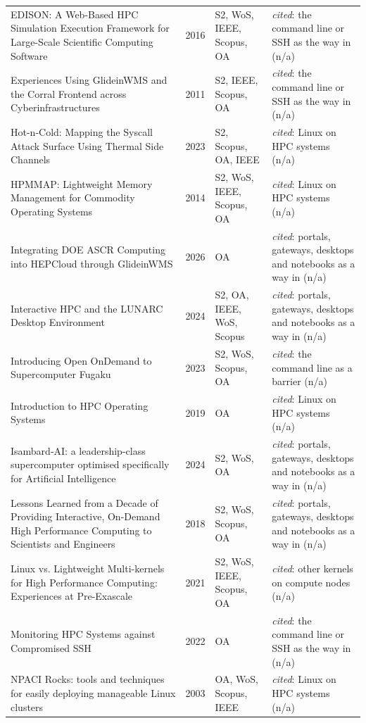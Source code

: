 \begin{longtable}{@{}%
  >{\raggedright\arraybackslash}p{}c%
  >{\raggedright\arraybackslash}p{}%
  >{\raggedright\arraybackslash}p{}@{}}
EDISON: A Web-Based HPC Simulation Execution Framework for Large-Scale Scientific Computing Software & 2016 & S2, WoS, IEEE, Scopus, OA & \emph{cited}: the command line or SSH as the way in (n/a) \\
Experiences Using GlideinWMS and the Corral Frontend across Cyberinfrastructures & 2011 & S2, IEEE, Scopus, OA & \emph{cited}: the command line or SSH as the way in (n/a) \\
Hot-n-Cold: Mapping the Syscall Attack Surface Using Thermal Side Channels & 2023 & S2, Scopus, OA, IEEE & \emph{cited}: Linux on HPC systems (n/a) \\
HPMMAP: Lightweight Memory Management for Commodity Operating Systems & 2014 & S2, WoS, IEEE, Scopus, OA & \emph{cited}: Linux on HPC systems (n/a) \\
Integrating DOE ASCR Computing into HEPCloud through GlideinWMS & 2026 & OA & \emph{cited}: portals, gateways, desktops and notebooks as a way in (n/a) \\
Interactive HPC and the LUNARC Desktop Environment & 2024 & S2, OA, IEEE, WoS, Scopus & \emph{cited}: portals, gateways, desktops and notebooks as a way in (n/a) \\
Introducing Open OnDemand to Supercomputer Fugaku & 2023 & S2, WoS, Scopus, OA & \emph{cited}: the command line as a barrier (n/a) \\
Introduction to HPC Operating Systems & 2019 & OA & \emph{cited}: Linux on HPC systems (n/a) \\
Isambard-AI: a leadership-class supercomputer optimised specifically for Artificial Intelligence & 2024 & S2, WoS, OA & \emph{cited}: portals, gateways, desktops and notebooks as a way in (n/a) \\
Lessons Learned from a Decade of Providing Interactive, On-Demand High Performance Computing to Scientists and Engineers & 2018 & S2, WoS, Scopus, OA & \emph{cited}: portals, gateways, desktops and notebooks as a way in (n/a) \\
Linux vs. Lightweight Multi-kernels for High Performance Computing: Experiences at Pre-Exascale & 2021 & S2, WoS, IEEE, Scopus, OA & \emph{cited}: other kernels on compute nodes (n/a) \\
Monitoring HPC Systems against Compromised SSH & 2022 & OA & \emph{cited}: the command line or SSH as the way in (n/a) \\
NPACI Rocks: tools and techniques for easily deploying manageable Linux clusters & 2003 & OA, WoS, Scopus, IEEE & \emph{cited}: Linux on HPC systems (n/a) \\

\end{longtable}
